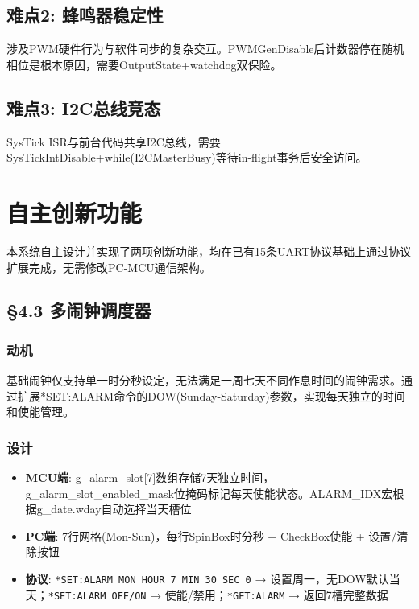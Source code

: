 \documentclass[12pt,hyperref,a4paper,UTF8]{ctexart}
\begin{document}
\subsection{难点2: 蜂鸣器稳定性} 涉及PWM硬件行为与软件同步的复杂交互。PWMGenDisable后计数器停在随机相位是根本原因，需要OutputState+watchdog双保险。

\subsection{难点3: I2C总线竞态} SysTick ISR与前台代码共享I2C总线，需要SysTickIntDisable+while(I2CMasterBusy)等待in-flight事务后安全访问。

\section{自主创新功能}

本系统自主设计并实现了两项创新功能，均在已有15条UART协议基础上通过协议扩展完成，无需修改PC-MCU通信架构。

\subsection{§4.3 多闹钟调度器}

\subsubsection{动机}

基础闹钟仅支持单一时分秒设定，无法满足一周七天不同作息时间的闹钟需求。通过扩展*SET:ALARM命令的DOW(Sunday-Saturday)参数，实现每天独立的时间和使能管理。

\subsubsection{设计}

\begin{itemize}
    \item \textbf{MCU端}: g\_alarm\_slot[7]数组存储7天独立时间，g\_alarm\_slot\_enabled\_mask位掩码标记每天使能状态。ALARM\_IDX宏根据g\_date.wday自动选择当天槽位
    \item \textbf{PC端}: 7行网格(Mon-Sun)，每行SpinBox时分秒 + CheckBox使能 + 设置/清除按钮
    \item \textbf{协议}: \texttt{*SET:ALARM MON HOUR 7 MIN 30 SEC 0} → 设置周一，无DOW默认当天；\texttt{*SET:ALARM OFF/ON} → 使能/禁用；\texttt{*GET:ALARM} → 返回7槽完整数据
\end{itemize}
\end{document}
